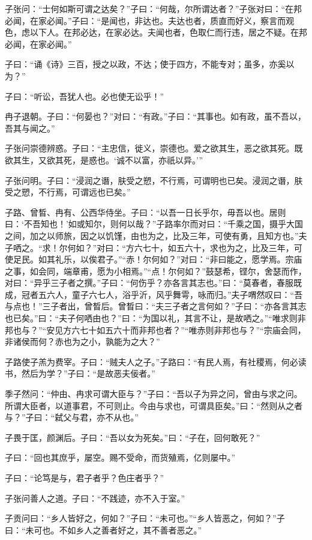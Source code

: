 \documentclass[a5paper]{ctexbook}
\begin{document}
    子张问：“士何如斯可谓之达矣？”子曰：“何哉，尔所谓达者？”子张对曰：“在邦必闻，在家必闻。”子曰：“是闻也，非达也。夫达也者，质直而好义，察言而观色，虑以下人。在邦必达，在家必达。夫闻也者，色取仁而行违，居之不疑。在邦必闻，在家必闻。”

    子曰：“诵《诗》三百，授之以政，不达；使于四方，不能专对；虽多，亦奚以为？”

    子曰：“听讼，吾犹人也。必也使无讼乎！”

    冉子退朝。子曰：“何晏也？”对曰：“有政。”子曰：“其事也。如有政，虽不吾以，吾其与闻之。”

    子张问崇德辨惑。子曰：“主忠信，徙义，崇德也。爱之欲其生，恶之欲其死。既欲其生，又欲其死，是惑也。‘诚不以富，亦祇以异。’”

    子张问明。子曰：“浸润之谮，肤受之愬，不行焉，可谓明也已矣。浸润之谮，肤受之愬，不行焉，可谓远也已矣。”

    子路、曾晳、冉有、公西华侍坐。子曰：“以吾一日长乎尔，毋吾以也。居则曰：‘不吾知也！’如或知尔，则何以哉？”子路率尔而对曰：“千乘之国，摄乎大国之间，加之以师旅，因之以饥馑，由也为之，比及三年，可使有勇，且知方也。”夫子哂之。“求！尔何如？”对曰：“方六七十，如五六十，求也为之，比及三年，可使足民。如其礼乐，以俟君子。”“赤！尔何如？”对曰：“非曰能之，愿学焉。宗庙之事，如会同，端章甫，愿为小相焉。”“点！尔何如？”鼓瑟希，铿尔，舍瑟而作，对曰：“异乎三子者之撰。”子曰：“何伤乎？亦各言其志也。”曰：“莫春者，春服既成，冠者五六人，童子六七人，浴乎沂，风乎舞雩，咏而归。”夫子喟然叹曰：“吾与点也！”三子者出，曾晳后。曾晳曰：“夫三子者之言何如？”子曰：“亦各言其志也已矣。”曰：“夫子何哂由也？”曰：“为国以礼，其言不让，是故哂之。”“唯求则非邦也与？”“安见方六七十如五六十而非邦也者？”“唯赤则非邦也与？”“宗庙会同，非诸侯而何？赤也为之小，孰能为之大？”

    子路使子羔为费宰。子曰：“贼夫人之子。”子路曰：“有民人焉，有社稷焉，何必读书，然后为学？”子曰：“是故恶夫佞者。”

    季子然问：“仲由、冉求可谓大臣与？”子曰：“吾以子为异之问，曾由与求之问。所谓大臣者，以道事君，不可则止。今由与求也，可谓具臣矣。”曰：“然则从之者与？”子曰：“弑父与君，亦不从也。”

    子畏于匡，颜渊后。子曰：“吾以女为死矣。”曰：“子在，回何敢死？”

    子曰：“回也其庶乎，屡空。赐不受命，而货殖焉，亿则屡中。”

    子曰：“论笃是与，君子者乎？色庄者乎？”

    子张问善人之道。子曰：“不践迹，亦不入于室。”

    子贡问曰：“乡人皆好之，何如？”子曰：“未可也。”“乡人皆恶之，何如？”子曰：“未可也。不如乡人之善者好之，其不善者恶之。”
\end{document}
